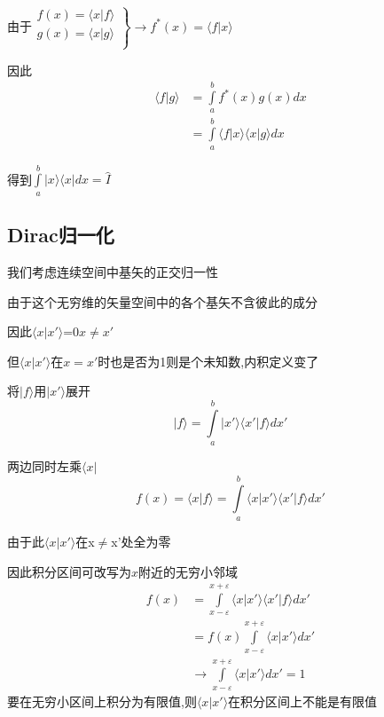\documentclass[lang=cn,10pt]{elegantbook}
\begin{document}
由于$\left. \begin{array}{r}
	f\left( x \right) =\langle x|f\rangle\\
	g\left( x \right) =\langle x|g\rangle\\
\end{array} \right\} \rightarrow f^*\left( x \right) =\langle f|x\rangle 
$

因此
\begin{equation*}
	\begin{split}
		\langle f|g\rangle &=\int\limits_a^b{f^*\left( x \right) g\left( x \right) dx}
		\\
		&=\int\limits_a^b{\langle f|x\rangle \langle x|g\rangle dx}	
	\end{split}
\end{equation*}

得到$\int\limits_a^b{| x\rangle \langle x| dx}=\hat{I}	$
\subsection{Dirac归一化}

我们考虑连续空间中基矢的正交归一性

由于这个无穷维的矢量空间中的各个基矢不含彼此的成分

因此$\langle x|x'\rangle$=0$x\ne x'$

但$\langle x|x'\rangle$在$x=x'$时也是否为1则是个未知数,内积定义变了

将$|f\rangle$用$|x'\rangle$展开
\begin{equation*}
	|f\rangle =\int\limits_a^b{|x'\rangle \langle x'|f\rangle dx'}
\end{equation*}

两边同时左乘$\langle x|$
\begin{equation*}
	f(x)=\langle x|f\rangle =\int\limits_a^b{\langle x|x'\rangle \langle x'|f\rangle dx'}
\end{equation*}

由于此$\langle x|x'\rangle$在x$\ne$x'处全为零

因此积分区间可改写为$ x$附近的无穷小邻域
\begin{equation*}
	\begin{split}
		f\left( x \right) &=\int\limits_{x-\varepsilon}^{x+\varepsilon}{\langle x|x'\rangle \langle x'|f\rangle dx'}
		\\
		&=f\left( x \right) \int\limits_{x-\varepsilon}^{x+\varepsilon}{\langle x|x'\rangle dx'}
		\\
		&\rightarrow \int\limits_{x-\varepsilon}^{x+\varepsilon}{\langle x|x'\rangle dx'}=1
	\end{split}
\end{equation*}
要在无穷小区间上积分为有限值,则$\langle x|x'\rangle$在积分区间上不能是有限值
\end{document}
